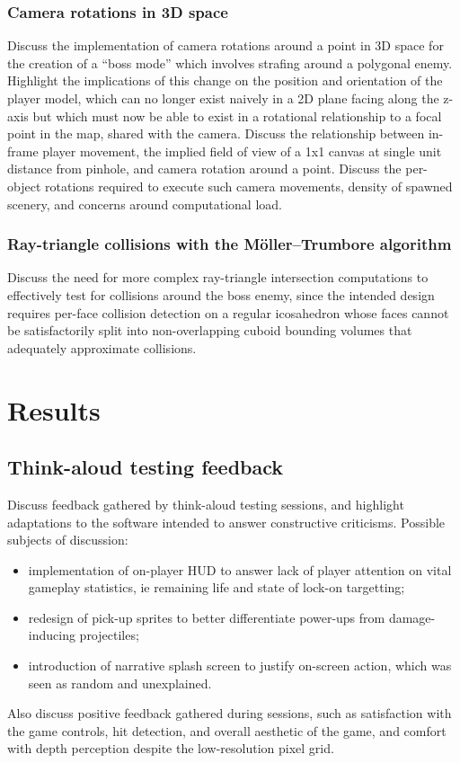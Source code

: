 \documentclass{article}
\begin{document}
\subsubsection*{Camera rotations in 3D space}
Discuss the implementation of camera rotations around a point in 3D space for the
creation of a ``boss mode'' which involves strafing around a polygonal enemy. Highlight
the implications of this change on the position and orientation of the player model,
which can no longer exist naively in a 2D plane facing along the z-axis but which
must now be able to exist in a rotational relationship to a focal point in the map,
shared with the camera. Discuss the relationship between in-frame player movement,
the implied field of view of a 1x1 canvas at single unit distance from pinhole, and
camera rotation around a point. Discuss the per-object rotations required to execute
such camera movements, density of spawned scenery, and concerns around computational
load.
\subsubsection*{Ray-triangle collisions with the Möller–Trumbore algorithm}
Discuss the need for more complex ray-triangle intersection computations to effectively
test for collisions around the boss enemy, since the intended design requires per-face
collision detection on a regular icosahedron whose faces cannot be satisfactorily
split into non-overlapping cuboid bounding volumes that adequately approximate
collisions.

\section{Results}
\subsection{Think-aloud testing feedback}
Discuss feedback gathered by think-aloud testing sessions, and highlight adaptations
to the software intended to answer constructive criticisms. Possible subjects of
discussion:
\begin{itemize}
   \item implementation of on-player HUD to answer lack of player attention on vital
   gameplay statistics, ie remaining life and state of lock-on targetting;
   \item redesign of pick-up sprites to better differentiate power-ups from
   damage-inducing projectiles;
   \item introduction of narrative splash screen to justify on-screen action, which
   was seen as random and unexplained.
\end{itemize}
Also discuss positive feedback gathered during sessions, such as satisfaction
with the game controls, hit detection, and overall aesthetic of the game, and comfort
with depth perception despite the low-resolution pixel grid.
\end{document}
